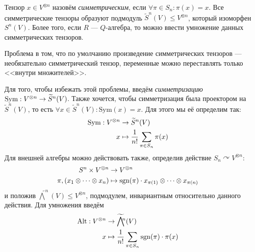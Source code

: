 Тензор $x \in V^{\otimes n}$ назовём \emph{симметрическим}, если $\forall \pi \in S_n: \pi(x) = x$.
Все симметрические тензоры образуют подмодуль $\tilde{S}^n(V) \le V^{\otimes n}$, который изоморфен $S^n(V)$.
Более того, если $R$ --- $Q$-алгебра, то можно ввести умножение данных симметрических тензоров.

Проблема в том, что по умолчанию произведение симметрических тензоров --- необязательно симметрический тензор, переменные можно переставлять только <<внутри множителей>>.

Для того, чтобы избежать этой проблемы, введём \emph{симметризацию} $\text{Sym}: V^{\otimes n} \rightarrow \widetilde{S}^n(V)$.
Также хочется, чтобы симметризация была проектором на $\tilde{S}^n(V)$, то есть $\forall x \in \tilde{S}^n(V): \text{Sym}(x) = x$.
Для этого мы её определим так: \begin{align*}
                                   \text{Sym}:V^{\otimes n} &\rightarrow \widetilde{S}^n(V)\\x &\mapsto \frac{1}{n!}\sum\limits_{\pi \in S_n}\pi(x)
\end{align*}
\ok
Для внешней алгебры можно действовать также, определив действие $S_n \curvearrowright V^{\otimes n}$: \begin{align*}
                                                                                                          S^n \times V^{\otimes n}&\rightarrow V^{\otimes n}\\\pi, (x_1 \otimes \dots \otimes x_n) &\mapsto \operatorname{sgn}(\pi) \cdot x_{\pi(1)} \otimes \dots \otimes x_{\pi(n)}
\end{align*}и положив $\tilde{\bigwedge}^n(V) \le V^{\otimes n}$, подмодулем, инвариантным относительно данного действия.
Для умножения введём \begin{align*}
                         \text{Alt}: V^{\otimes n} &\rightarrow \widetilde{\bigwedge}\!\!{}^n(V)\\x &\mapsto \frac{1}{n!}\sum\limits_{\pi \in S_n}\operatorname{sgn}(\pi)\cdot\pi(x)
\end{align*}

